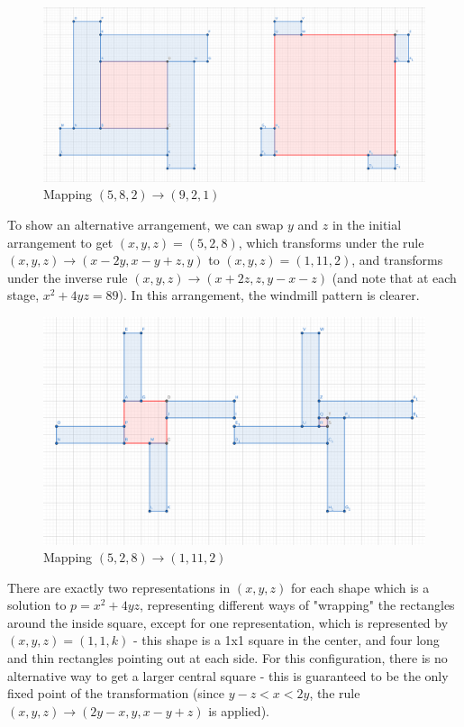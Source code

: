 \documentclass{article}
\begin{document}
\begin{figure}
	\includegraphics[width=\linewidth, bb=0px 0px 800px 400px]{windmill1.png}
	\caption{Mapping $(5,8,2) \to (9,2,1)$}
	\label{fig:windmill1}
\end{figure}

To show an alternative arrangement, we can swap $y$ and $z$ in the initial arrangement
to get $(x,y,z)=(5,2,8)$, which transforms under the rule $(x,y,z) \to (x-2y, x-y+z, y)$
to $(x,y,z) = (1, 11, 2)$, and transforms under the inverse rule $(x,y,z) \to 
(x+2z, z, y-x-z)$ (and note that at each stage, $x^2+4yz = 89$). In this arrangement,
the windmill pattern is clearer.


\begin{figure}
	\includegraphics[width=\linewidth, viewport=0px 0px 1200px 715px]{windmill2.png}
	\caption{Mapping $(5,2,8) \to (1,11,2)$}
	\label{fig:windmill2}
\end{figure}

There are exactly two representations in $(x,y,z)$ for each shape
which is a solution to $p=x^2+4yz$, representing different ways of "wrapping" the
rectangles around the inside square, except for one representation, which is represented
by $(x,y,z) = (1,1,k)$ - this shape is a 1x1 square in the center, and four long and thin
rectangles pointing out at each side. For this configuration, there is no alternative way
to get a larger central square - this is guaranteed to be the only fixed point of the
transformation (since $y-z < x < 2y$, the rule $(x,y,z) \to (2y-x, y, x-y+z)$ is applied).
\end{document}
